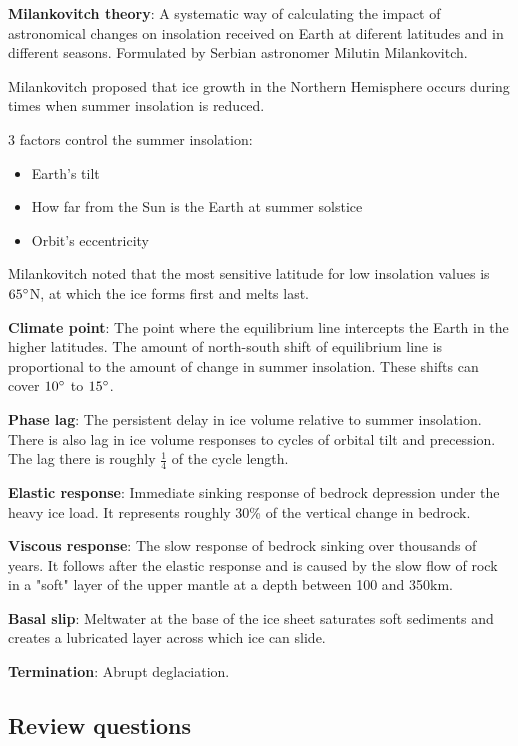 \textbf{Milankovitch theory}: A systematic way of calculating the impact of
astronomical changes on insolation received on Earth at diferent latitudes and
in different seasons. Formulated by Serbian astronomer Milutin Milankovitch.

Milankovitch proposed that ice growth in the Northern Hemisphere occurs
during times when summer insolation is reduced.

3 factors control the summer insolation:

\begin{itemize}
	\item Earth's tilt
	\item How far from the Sun is the Earth at summer solstice
	\item Orbit's eccentricity
\end{itemize}

Milankovitch noted that the most sensitive latitude for low insolation values
is $65 \degree$N, at which the ice forms first and melts last.

\textbf{Climate point}: The point where the equilibrium line intercepts the
Earth in the higher latitudes. The amount of north-south shift of equilibrium
line is proportional to the amount of change in summer insolation. These shifts
can cover $10 \degree$ to $15 \degree$.

\textbf{Phase lag}: The persistent delay in ice volume relative to summer
insolation. There is also lag in ice volume responses to cycles of orbital
tilt and precession. The lag there is roughly $\frac{1}{4}$ of the cycle
length.

\textbf{Elastic response}: Immediate sinking response of bedrock depression
under the heavy ice load. It represents roughly 30\% of the vertical change
in bedrock.

\textbf{Viscous response}: The slow response of bedrock sinking over thousands
of years. It follows after the elastic response and is caused by the slow flow
of rock in a "soft" layer of the upper mantle at a depth between 100 and 350km.

\textbf{Basal slip}: Meltwater at the base of the ice sheet saturates soft
sediments and creates a lubricated layer across which ice can slide.

\textbf{Termination}: Abrupt deglaciation.

\subsection{Review questions}

